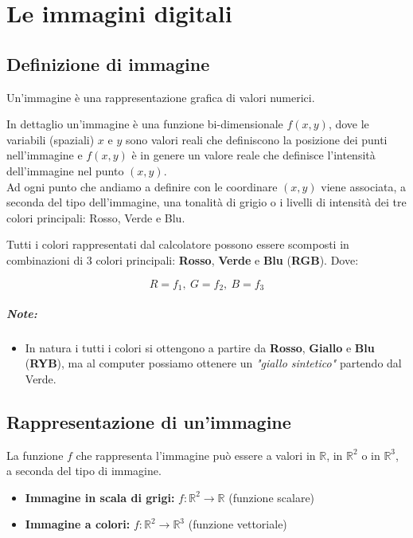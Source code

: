 \chapter{Le immagini digitali}

\section{Definizione di immagine}

\begin{definition}
    Un'immagine è una rappresentazione grafica di valori numerici.
\end{definition}

In dettaglio un'immagine è una funzione bi-dimensionale $f(x,y)$, dove le
variabili (spaziali) $x$ e $y$ sono valori reali che definiscono la posizione
dei punti nell'immagine e $f(x,y)$ è in genere un valore reale che definisce
l'intensità dell'immagine nel punto $(x,y)$.\\
Ad ogni punto che andiamo a definire con le coordinare $(x,y)$ viene associata,
a seconda del tipo dell'immagine, una tonalità di grigio o i livelli di
intensità dei tre colori principali: Rosso, Verde e Blu.

Tutti i colori rappresentati dal calcolatore possono essere scomposti in
combinazioni di 3 colori principali: \textbf{Rosso}, \textbf{Verde} e
\textbf{Blu} (\textbf{RGB}). Dove:

$$
    R = f_1, \ G = f_2, \ B = f_3
$$

\paragraph{Note:}
\begin{itemize}
    \item In natura i tutti i colori si ottengono a partire da \textbf{Rosso},
          \textbf{Giallo} e \textbf{Blu} (\textbf{RYB}), ma al computer possiamo
          ottenere un \textit{"giallo sintetico"} partendo dal Verde.
\end{itemize}

\section{Rappresentazione di un'immagine}
La funzione $f$ che rappresenta l'immagine può essere a valori in $\mathbb{R}$,
in $\mathbb{R}^2$ o in $\mathbb{R}^3$, a seconda del tipo di immagine.

\begin{itemize}
    \item \textbf{Immagine in scala di grigi:} $f:\mathbb{R}^2 \rightarrow
              \mathbb{R}$ (funzione scalare)
    \item \textbf{Immagine a colori:} $f:\mathbb{R}^2 \rightarrow \mathbb{R}^3$
          (funzione vettoriale)
\end{itemize}

